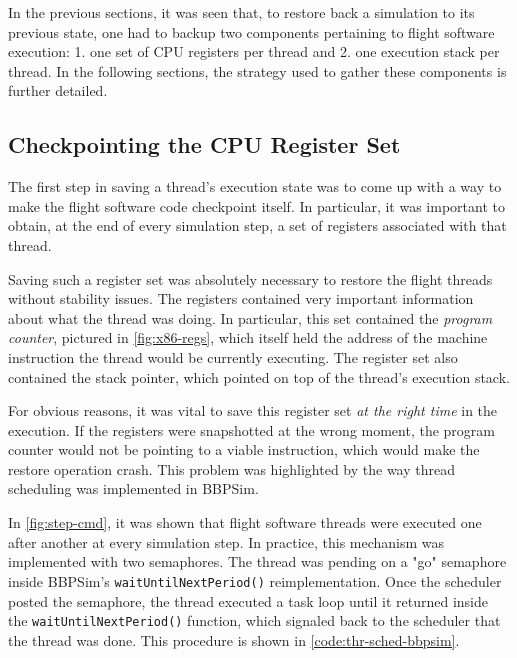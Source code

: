 In the previous sections, it was seen that, to restore back a simulation to its previous state, one had to backup two components pertaining to flight software execution: 1. one set of CPU registers per thread and 2. one execution stack per thread. In the following sections, the strategy used to gather these components is further detailed.

\subsection*{Checkpointing the CPU Register Set}
The first step in saving a thread's execution state was to come up with a way to make the flight software code checkpoint itself. In particular, it was important to obtain, at the end of every simulation step, a set of registers associated with that thread.

Saving such a register set was absolutely necessary to restore the flight threads without stability issues. The registers contained very important information about what the thread was doing. In particular, this set contained the \textit{program counter}, pictured in \autoref{fig:x86-regs}, which itself held the address of the machine instruction the thread would be currently executing. The register set also contained the stack pointer, which pointed on top of the thread's execution stack.

For obvious reasons, it was vital to save this register set \textit{at the right time} in the execution. If the registers were snapshotted at the wrong moment, the program counter would not be pointing to a viable instruction, which would make the restore operation crash. This problem was highlighted by the way thread scheduling was implemented in BBPSim.

In \autoref{fig:step-cmd}, it was shown that flight software threads were executed one after another at every simulation step. In practice, this mechanism was implemented with two semaphores. The thread was pending on a "go" semaphore inside BBPSim's \texttt{waitUntilNextPeriod()} reimplementation. Once the scheduler posted the semaphore, the thread executed a task loop until it returned inside the \texttt{waitUntilNextPeriod()} function, which signaled back to the scheduler that the thread was done. This procedure is shown in \autoref{code:thr-sched-bbpsim}.

